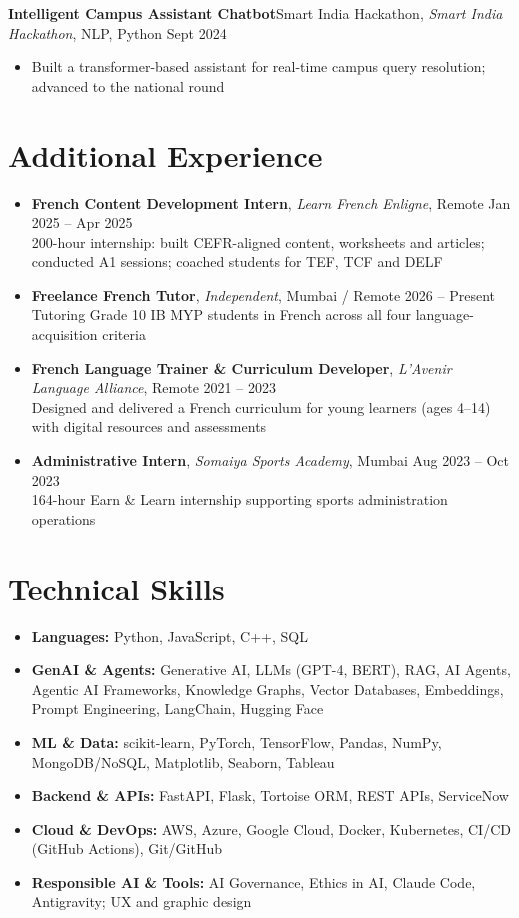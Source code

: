 \documentclass[10pt,a4paper]{article}
\newcommand{\job}[4]{\textbf{#1}\ifx\relax#2\relax\else, \textit{#2}\fi, #3 \hfill #4\par\vspace{-1pt}}
\begin{document}
\job{Intelligent Campus Assistant Chatbot}{Smart India Hackathon}{NLP, Python}{Sept 2024}
\begin{itemize}
  \item Built a transformer-based assistant for real-time campus query resolution; advanced to the national round
\end{itemize}

\section*{Additional Experience}
\begin{itemize}[leftmargin=1.1em, itemsep=2pt]
  \item \textbf{French Content Development Intern}, \textit{Learn French Enligne}, Remote \hfill Jan 2025 -- Apr 2025\\
        200-hour internship: built CEFR-aligned content, worksheets and articles; conducted A1 sessions; coached students for TEF, TCF and DELF
  \item \textbf{Freelance French Tutor}, \textit{Independent}, Mumbai / Remote \hfill 2026 -- Present\\
        Tutoring Grade 10 IB MYP students in French across all four language-acquisition criteria
  \item \textbf{French Language Trainer \& Curriculum Developer}, \textit{L'Avenir Language Alliance}, Remote \hfill 2021 -- 2023\\
        Designed and delivered a French curriculum for young learners (ages 4--14) with digital resources and assessments
  \item \textbf{Administrative Intern}, \textit{Somaiya Sports Academy}, Mumbai \hfill Aug 2023 -- Oct 2023\\
        164-hour Earn \& Learn internship supporting sports administration operations
\end{itemize}

\section*{Technical Skills}
\begin{itemize}[leftmargin=1.1em]
  \item \textbf{Languages:} Python, JavaScript, C++, SQL
  \item \textbf{GenAI \& Agents:} Generative AI, LLMs (GPT-4, BERT), RAG, AI Agents, Agentic AI Frameworks, Knowledge Graphs, Vector Databases, Embeddings, Prompt Engineering, LangChain, Hugging Face
  \item \textbf{ML \& Data:} scikit-learn, PyTorch, TensorFlow, Pandas, NumPy, MongoDB/NoSQL, Matplotlib, Seaborn, Tableau
  \item \textbf{Backend \& APIs:} FastAPI, Flask, Tortoise ORM, REST APIs, ServiceNow
  \item \textbf{Cloud \& DevOps:} AWS, Azure, Google Cloud, Docker, Kubernetes, CI/CD (GitHub Actions), Git/GitHub
  \item \textbf{Responsible AI \& Tools:} AI Governance, Ethics in AI, Claude Code, Antigravity; UX and graphic design
\end{itemize}
\end{document}
